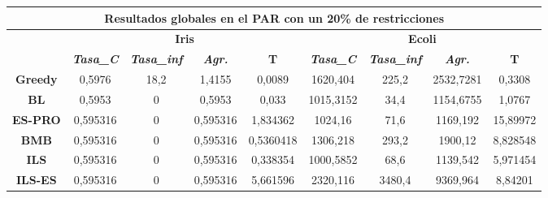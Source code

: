 \documentclass[12pt, spanish]{article}
\begin{document}
\begin{table}[H]
\begin{tabular}{|c|c|c|c|c|c|c|c|c|}
\hline
\multicolumn{9}{|c|}{\textbf{Resultados globales en el PAR con un 20\% de restricciones}}                                                                                                                                               \\ \hline
\multicolumn{1}{|l|}{\multirow{2}{*}{}} & \multicolumn{4}{c|}{\textbf{Iris}}                                                            & \multicolumn{4}{c|}{\textbf{Ecoli}}                                                           \\ \cline{2-9} 
\multicolumn{1}{|l|}{}                  & \textit{\textbf{Tasa\_C}} & \textit{\textbf{Tasa\_inf}} & \textit{\textbf{Agr.}} & \textbf{T} & \textit{\textbf{Tasa\_C}} & \textit{\textbf{Tasa\_inf}} & \textit{\textbf{Agr.}} & \textbf{T} \\ \hline
\textbf{Greedy}                         & 0,5976                    & 18,2                        & 1,4155                 & 0,0089     & 1620,404                  & 225,2                       & 2532,7281              & 0,3308     \\ \hline
\textbf{BL}                             & 0,5953                    & 0                           & 0,5953                 & 0,033      & 1015,3152                 & 34,4                        & 1154,6755              & 1,0767     \\ \hline
\textbf{ES-PRO}                & 0,595316                  & 0                           & 0,595316               & 1,834362   & 1024,16                   & 71,6                        & 1169,192               & 15,89972   \\ \hline
\textbf{BMB}                            & 0,595316                  & 0                           & 0,595316               & 0,5360418  & 1306,218                  & 293,2                       & 1900,12                & 8,828548   \\ \hline
\textbf{ILS}                            & 0,595316                  & 0                           & 0,595316               & 0,338354   & 1000,5852                 & 68,6                        & 1139,542               & 5,971454   \\ \hline
\textbf{ILS-ES}                         & 0,595316                  & 0                           & 0,595316               & 5,661596   & 2320,116                  & 3480,4                      & 9369,964               & 8,84201    \\ \hline
\end{tabular}
\end{table}
\end{document}
